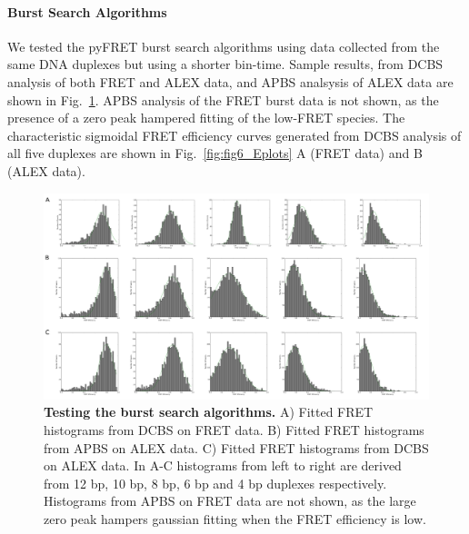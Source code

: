 \paragraph{Burst Search Algorithms}
We tested the pyFRET burst search algorithms using data collected from the same DNA duplexes but using a shorter bin-time. Sample results, from DCBS analysis of both FRET and ALEX data, and APBS analsysis of ALEX data are shown in Fig.~\ref{fig:burst_search}. APBS analysis of the FRET burst data is not shown, as the presence of a zero peak hampered fitting of the low-FRET species. The characteristic sigmoidal FRET efficiency curves generated from DCBS analysis of all five duplexes are shown in Fig.~\ref{fig:fig6_Eplots} A (FRET data) and B (ALEX data).

\begin{figure}[!ht]
   \begin{center}
      \includegraphics*[clip=true, width=6in]{pyFRET/burst_search.pdf}
      \caption{{\bf Testing the burst search algorithms.} A) Fitted FRET histograms from DCBS on FRET data. B) Fitted FRET histograms from APBS on ALEX data. C) Fitted FRET histograms from DCBS on ALEX data. In A-C histograms from left to right are derived from 12 bp, 10 bp, 8 bp, 6 bp and 4 bp duplexes respectively. Histograms from APBS on FRET data are not shown, as the large zero peak hampers gaussian fitting when the FRET efficiency is low.}
      \label{fig:burst_search}
   \end{center}
\end{figure}


